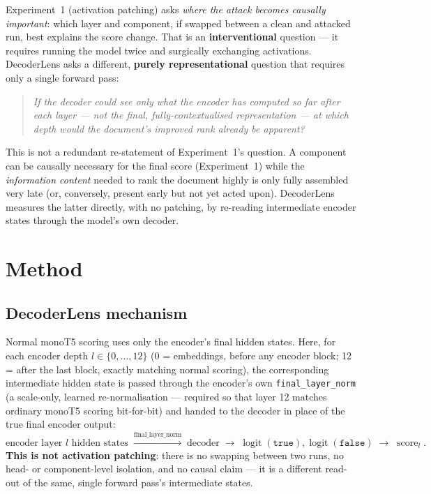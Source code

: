 \documentclass[11pt]{article}
\newcommand{\score}{\operatorname{score}}
\begin{document}
Experiment~1 (activation patching) asks \emph{where the attack becomes
causally important}: which layer and component, if swapped between a clean
and attacked run, best explains the score change. That is an
\textbf{interventional} question — it requires running the model twice and
surgically exchanging activations. DecoderLens asks a different,
\textbf{purely representational} question that requires only a single
forward pass:

\begin{quote}
\itshape If the decoder could see \emph{only} what the encoder has computed
so far after each layer — not the final, fully-contextualised
representation — at which depth would the document's improved rank already
be apparent?
\end{quote}

This is not a redundant re-statement of Experiment~1's question. A
component can be causally necessary for the final score (Experiment~1) while
the \emph{information content} needed to rank the document highly is only
fully assembled very late (or, conversely, present early but not yet acted
upon). DecoderLens measures the latter directly, with no patching, by
re-reading intermediate encoder states through the model's own decoder.

\section{Method}

\subsection{DecoderLens mechanism}

Normal monoT5 scoring uses only the encoder's final hidden states. Here,
for each encoder depth $l \in \{0, \ldots, 12\}$ (0 = embeddings, before any
encoder block; 12 = after the last block, exactly matching normal scoring),
the corresponding intermediate hidden state is passed through the encoder's
own \texttt{final\_layer\_norm} (a scale-only, learned re-normalisation —
required so that layer 12 matches ordinary monoT5 scoring bit-for-bit) and
handed to the decoder in place of the true final encoder output:
\[
\text{encoder layer } l \text{ hidden states} \;\xrightarrow{\text{final\_layer\_norm}}\;
\text{decoder} \;\rightarrow\; \operatorname{logit}(\texttt{true}), \operatorname{logit}(\texttt{false})
\;\rightarrow\; \score_l.
\]
\textbf{This is not activation patching}: there is no swapping between two
runs, no head- or component-level isolation, and no causal claim — it is a
different read-out of the same, single forward pass's intermediate states.
\end{document}
